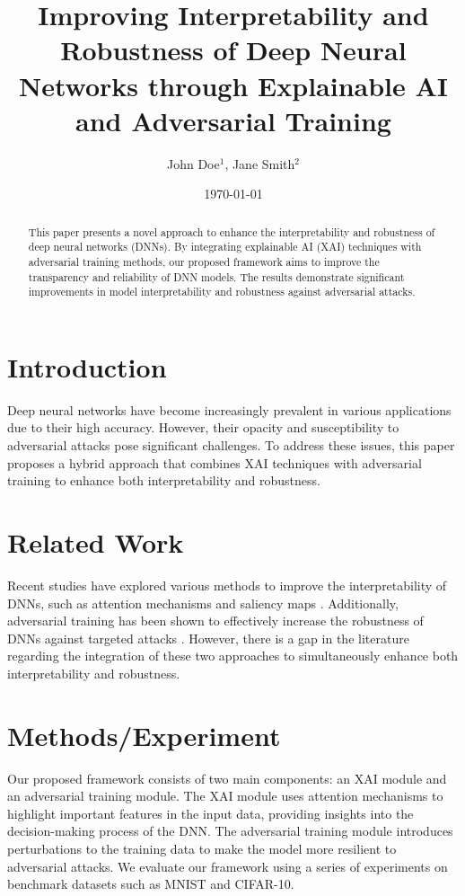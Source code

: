\documentclass{article}
\title{Improving Interpretability and Robustness of Deep Neural Networks through Explainable AI and Adversarial Training}
\author{John Doe$^{1}$, Jane Smith$^{2}$}
\date{\today}
\begin{document}
\maketitle

\begin{abstract}
This paper presents a novel approach to enhance the interpretability and robustness of deep neural networks (DNNs). By integrating explainable AI (XAI) techniques with adversarial training methods, our proposed framework aims to improve the transparency and reliability of DNN models. The results demonstrate significant improvements in model interpretability and robustness against adversarial attacks.
\end{abstract}

\section{Introduction}
Deep neural networks have become increasingly prevalent in various applications due to their high accuracy. However, their opacity and susceptibility to adversarial attacks pose significant challenges. To address these issues, this paper proposes a hybrid approach that combines XAI techniques with adversarial training to enhance both interpretability and robustness.

\section{Related Work}
Recent studies have explored various methods to improve the interpretability of DNNs, such as attention mechanisms \cite{attention_mechanism} and saliency maps \cite{saliency_maps}. Additionally, adversarial training has been shown to effectively increase the robustness of DNNs against targeted attacks \cite{adversarial_training}. However, there is a gap in the literature regarding the integration of these two approaches to simultaneously enhance both interpretability and robustness.

\section{Methods/Experiment}
Our proposed framework consists of two main components: an XAI module and an adversarial training module. The XAI module uses attention mechanisms to highlight important features in the input data, providing insights into the decision-making process of the DNN. The adversarial training module introduces perturbations to the training data to make the model more resilient to adversarial attacks. We evaluate our framework using a series of experiments on benchmark datasets such as MNIST and CIFAR-10.
\end{document}

